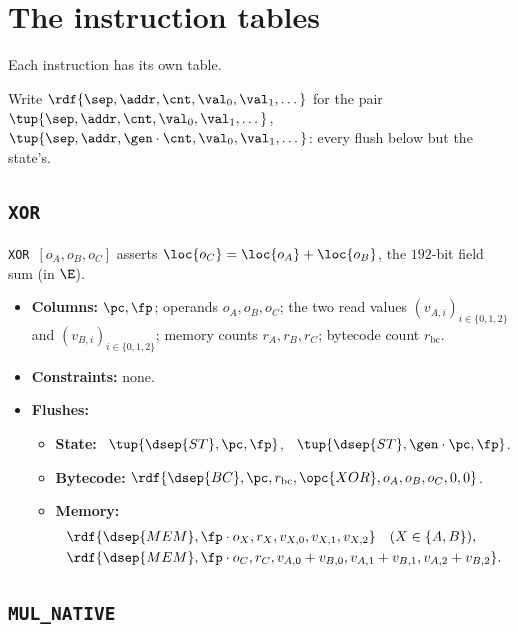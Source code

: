\section{The instruction tables}\label{sec:tables}

Each instruction has its own table.

Write $\rdf{\sep,\addr,\cnt,\val_0,\val_1, \dots}$ for the pair \pull\ $\tup{\sep,\addr,\cnt,\val_0,\val_1, \dots }$, \push\ $\tup{\sep,\addr,\gen\cdot\cnt,\val_0,\val_1, \dots}$: every flush below but the state's.

\subsection{\texttt{XOR}}\label{sec:tab-xor}

\texttt{XOR}\ $[o_A,o_B,o_C]$ asserts $\loc{o_C}=\loc{o_A}+\loc{o_B}$, the $192$-bit field sum (in $\E$).
\begin{itemize}
\item \textbf{Columns:} $\pc,\fp$; operands $o_A,o_B,o_C$; the two read values $(v_{A,i})_{i\in\{0,1,2\}}$ and $(v_{B,i})_{i\in\{0,1,2\}}$; memory counts $r_A,r_B,r_C$; bytecode count $r_{\mathrm{bc}}$.
\item \textbf{Constraints:} none.
\item \textbf{Flushes:}
  \begin{itemize}
  \item \textbf{State:} \pull\ $\tup{\dsep{ST},\pc,\fp}$, \push\ $\tup{\dsep{ST},\gen\cdot\pc,\fp}$.
  \item \textbf{Bytecode:} $\rdf{\dsep{BC},\pc,r_{\mathrm{bc}},\opc{XOR},o_A,o_B,o_C,0,0}$.
  \item \textbf{Memory:}
    \begin{align*}
      &\rdf{\dsep{MEM},\fp\cdot o_X,r_X,v_{X,0},v_{X,1},v_{X,2}}\quad(X\in\{A,B\}),\\
      &\rdf{\dsep{MEM},\fp\cdot o_C,r_C,v_{A,0}+v_{B,0},v_{A,1}+v_{B,1},v_{A,2}+v_{B,2}}.
    \end{align*}
  \end{itemize}
\end{itemize}

\subsection{\texttt{MUL\_NATIVE}}\label{sec:tab-mul}

